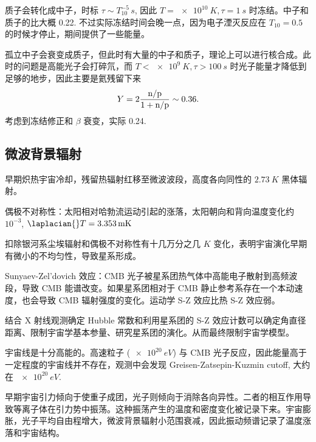 \documentclass[../天体物理基础.tex]{subfiles}
\begin{document}
质子会转化成中子，时标 $\tau\sim T_{10}^{-5}\,\unit{s}$, 因此 $T=\qty{e10}{K},\tau=\qty{1}{s}$ 时冻结。中子和质子的比大概 0.22. 不过实际冻结时间会晚一点，因为电子湮灭反应在 $T_{10}=0.5$ 的时候才停止，期间提供了一些能量。

孤立中子会衰变成质子，但此时有大量的中子和质子，理论上可以进行核合成。此时的问题是高能光子会打碎氘，而 $T<\qty{e9}{K},\tau>\qty{100}{s}$ 时光子能量才降低到足够的地步，因此主要是氦残留下来
\begin{equation}
Y=2\frac{\ce{n}/\ce{p}}{1+\ce{n}/\ce{p}}\sim0.36.
\end{equation}
考虑到冻结修正和 $\beta$ 衰变，实际 0.24.

\subsection{微波背景辐射}
早期炽热宇宙冷却，残留热辐射红移至微波波段，高度各向同性的 $\qty{2.73}{K}$ 黑体辐射。

偶极不对称性：太阳相对哈勃流运动引起的涨落，太阳朝向和背向温度变化约 $10^{-3}$, $\laplacian{}T=\qty{3.353}{mK}$

扣除银河系尘埃辐射和偶极不对称性有十几万分之几 $\unit{K}$ 变化，表明宇宙演化早期有微小的不均匀性，导致星系形成。

Sunyaev-Zel'dovich 效应：CMB 光子被星系团热气体中高能电子散射到高频波段，导致 CMB 能谱改变。如果星系团相对于 CMB 静止参考系存在一个本动速度，也会导致 CMB 辐射强度的变化。运动学 S-Z 效应比热 S-Z 效应弱。

结合 X 射线观测确定 Hubble 常数和利用星系团的 S-Z 效应计数可以确定角直径距离、限制宇宙学基本参量、研究星系团的演化。从而最终限制宇宙学模型。

宇宙线是十分高能的。高速粒子 ($\qty{e20}{eV}$) 与 CMB 光子反应，因此能量高于一定程度的宇宙线并不存在，观测中会发现 Greisen-Zatsepin-Kuzmin cutoff, 大约在 $\qty{e20}{eV}$.

早期宇宙引力倾向于使重子成团，光子则倾向于消除各向异性。二者的相互作用导致等离子体在引力势中振荡。这种振荡产生的温度和密度变化被记录下来。宇宙膨胀，光子平均自由程增大，微波背景辐射小范围衰减，因此振动频谱记录了温度涨落和宇宙结构。
\end{document}
